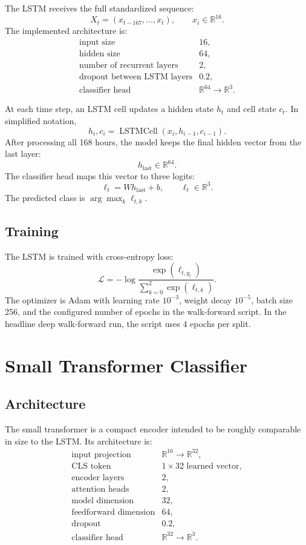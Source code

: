 \documentclass[11pt]{article}
\begin{document}
The LSTM receives the full standardized sequence:
\[
X_t = (x_{t-167}, \ldots, x_t), \qquad x_i \in \mathbb{R}^{16}.
\]
The implemented architecture is:
\[
\begin{array}{ll}
\text{input size} & 16,\\
\text{hidden size} & 64,\\
\text{number of recurrent layers} & 2,\\
\text{dropout between LSTM layers} & 0.2,\\
\text{classifier head} & \mathbb{R}^{64} \rightarrow \mathbb{R}^{3}.
\end{array}
\]

At each time step, an LSTM cell updates a hidden state \(h_t\) and cell state
\(c_t\). In simplified notation,
\[
h_i, c_i = \operatorname{LSTMCell}(x_i, h_{i-1}, c_{i-1}).
\]
After processing all 168 hours, the model keeps the final hidden vector from
the last layer:
\[
h_{\text{last}} \in \mathbb{R}^{64}.
\]
The classifier head maps this vector to three logits:
\[
\ell_t = W h_{\text{last}} + b, \qquad \ell_t \in \mathbb{R}^{3}.
\]
The predicted class is \(\arg\max_k \ell_{t,k}\).

\subsection{Training}

The LSTM is trained with cross-entropy loss:
\[
\mathcal{L} = -\log
\frac{\exp(\ell_{t,y_t})}{\sum_{k=0}^{2}\exp(\ell_{t,k})}.
\]
The optimizer is Adam with learning rate \(10^{-3}\), weight decay
\(10^{-5}\), batch size 256, and the configured number of epochs in the
walk-forward script. In the headline deep walk-forward run, the script uses 4
epochs per split.

\section{Small Transformer Classifier}

\subsection{Architecture}

The small transformer is a compact encoder intended to be roughly comparable
in size to the LSTM. Its architecture is:
\[
\begin{array}{ll}
\text{input projection} & \mathbb{R}^{16} \rightarrow \mathbb{R}^{32},\\
\text{CLS token} & 1 \times 32 \text{ learned vector},\\
\text{encoder layers} & 2,\\
\text{attention heads} & 2,\\
\text{model dimension} & 32,\\
\text{feedforward dimension} & 64,\\
\text{dropout} & 0.2,\\
\text{classifier head} & \mathbb{R}^{32} \rightarrow \mathbb{R}^{3}.
\end{array}
\]
\end{document}
